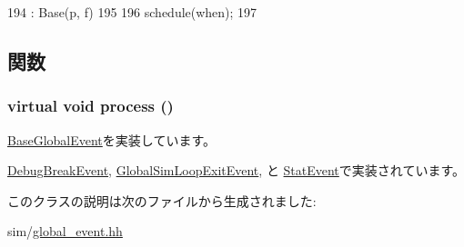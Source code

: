 \begin{DoxyCode}
194         : Base(p, f)
195     {
196         schedule(when);
197     }
\end{DoxyCode}


\subsection{関数}
\hypertarget{classGlobalEvent_a142b75b68a6291400e20fb0dd905b1c8}{
\subsubsection[{process}]{\setlength{\rightskip}{0pt plus 5cm}virtual void process ()}}
\label{classGlobalEvent_a142b75b68a6291400e20fb0dd905b1c8}


\hyperlink{classBaseGlobalEvent_a142b75b68a6291400e20fb0dd905b1c8}{BaseGlobalEvent}を実装しています。

\hyperlink{structDebugBreakEvent_a2e9c5136d19b1a95fc427e0852deab5c}{DebugBreakEvent}, \hyperlink{classGlobalSimLoopExitEvent_a2e9c5136d19b1a95fc427e0852deab5c}{GlobalSimLoopExitEvent}, と \hyperlink{classStats_1_1StatEvent_a6780fc1879338e1ff38faf7279ec6a0b}{StatEvent}で実装されています。

このクラスの説明は次のファイルから生成されました:\begin{DoxyCompactItemize}
\item 
sim/\hyperlink{global__event_8hh}{global\_\-event.hh}\end{DoxyCompactItemize}

